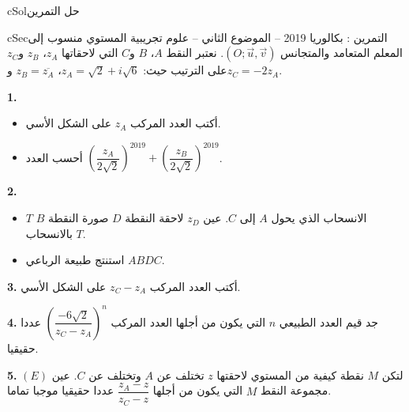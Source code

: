 \documentclass[12pt,a4paper]{article}
\newenvironment{BOX}[2]{\begin{otherlanguage}{english}\begin{arbox}{#1}{#2}}{\end{arbox}\end{otherlanguage}}
\newcounter{exo}
\newenvironment{tamrin}[1]{\stepcounter{exo}\begin{BOX}{cSec}{التمرين \theexo: #1}}{\end{BOX}}
\newenvironment{hal}{\Needspace{12\baselineskip}\begin{otherlanguage}{english}\begin{arbox}[breakable]{cSol}{حل التمرين \theexo}}{\end{arbox}\end{otherlanguage}}
\newenvironment{LTR}{\begin{otherlanguage}{english}}{\end{otherlanguage}}
\newenvironment{sq}{\begin{itemize}[leftmargin=2.4em,itemsep=3pt]}{\end{itemize}}
\newcommand{\qa}{\item[(أ)]}\newcommand{\qb}{\item[(ب)]}\newcommand{\qc}{\item[(جـ)]}\newcommand{\qd}{\item[(د)]}\newcommand{\qe}{\item[(هـ)]}
\newcommand{\QQ}[1]{\par\smallskip\textbf{#1.} }
\begin{document}
\begin{hal}
\begin{center}\begin{LTR}\end{LTR}\end{center}
\end{hal}

\begin{tamrin}{بكالوريا 2019 -- الموضوع الثاني -- علوم تجريبية}
المستوي منسوب إلى المعلم المتعامد والمتجانس $(O;\vec u,\vec v)$.
نعتبر النقط $A$، $B$ و$C$ التي لاحقاتها $z_A$، $z_B$ و$z_C$ على الترتيب حيث: $z_A=\sqrt2+i\sqrt6$، $z_B=\overline{z_A}$ و$z_C=-2z_A$.
\QQ{1}
\begin{sq}
\qa أكتب العدد المركب $z_A$ على الشكل الأسي.
\qb أحسب العدد $\left(\dfrac{z_A}{2\sqrt2}\right)^{2019}+\left(\dfrac{z_B}{2\sqrt2}\right)^{2019}$.
\end{sq}
\QQ{2}
\begin{sq}
\qa $T$ الانسحاب الذي يحول $A$ إلى $C$. عين $z_D$ لاحقة النقطة $D$ صورة النقطة $B$ بالانسحاب $T$.
\qb استنتج طبيعة الرباعي $ABDC$.
\end{sq}
\QQ{3} أكتب العدد المركب $z_C-z_A$ على الشكل الأسي.
\QQ{4} جد قيم العدد الطبيعي $n$ التي يكون من أجلها العدد المركب $\left(\dfrac{-6\sqrt2}{z_C-z_A}\right)^n$ عددا حقيقيا.
\QQ{5} لتكن $M$ نقطة كيفية من المستوي لاحقتها $z$ تختلف عن $A$ وتختلف عن $C$.
عين $(E)$ مجموعة النقط $M$ التي يكون من أجلها $\dfrac{z_A-z}{z_C-z}$ عددا حقيقيا موجبا تماما.
\end{tamrin}
\end{document}
